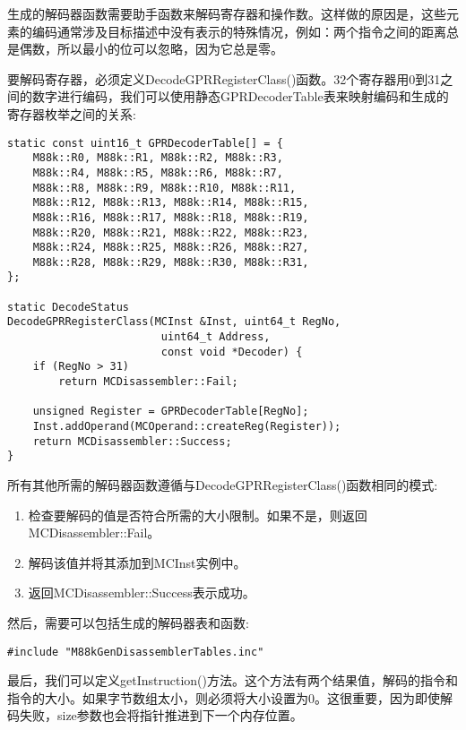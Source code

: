 生成的解码器函数需要助手函数来解码寄存器和操作数。这样做的原因是，这些元素的编码通常涉及目标描述中没有表示的特殊情况，例如：两个指令之间的距离总是偶数，所以最小的位可以忽略，因为它总是零。\par

要解码寄存器，必须定义DecodeGPRRegisterClass()函数。32个寄存器用0到31之间的数字进行编码，我们可以使用静态GPRDecoderTable表来映射编码和生成的寄存器枚举之间的关系:\par

\begin{lstlisting}[caption={}]
static const uint16_t GPRDecoderTable[] = {
	M88k::R0, M88k::R1, M88k::R2, M88k::R3,
	M88k::R4, M88k::R5, M88k::R6, M88k::R7,
	M88k::R8, M88k::R9, M88k::R10, M88k::R11,
	M88k::R12, M88k::R13, M88k::R14, M88k::R15,
	M88k::R16, M88k::R17, M88k::R18, M88k::R19,
	M88k::R20, M88k::R21, M88k::R22, M88k::R23,
	M88k::R24, M88k::R25, M88k::R26, M88k::R27,
	M88k::R28, M88k::R29, M88k::R30, M88k::R31,
};

static DecodeStatus
DecodeGPRRegisterClass(MCInst &Inst, uint64_t RegNo,
						uint64_t Address,
						const void *Decoder) {
	if (RegNo > 31)
		return MCDisassembler::Fail;
		
	unsigned Register = GPRDecoderTable[RegNo];
	Inst.addOperand(MCOperand::createReg(Register));
	return MCDisassembler::Success;
}
\end{lstlisting}

所有其他所需的解码器函数遵循与DecodeGPRRegisterClass()函数相同的模式:\par

\begin{enumerate}
\item 检查要解码的值是否符合所需的大小限制。如果不是，则返回MCDisassembler::Fail。

\item 解码该值并将其添加到MCInst实例中。

\item 返回MCDisassembler::Success表示成功。

\end{enumerate}

然后，需要可以包括生成的解码器表和函数:\par

\begin{lstlisting}[caption={}]
#include "M88kGenDisassemblerTables.inc"
\end{lstlisting}

最后，我们可以定义getInstruction()方法。这个方法有两个结果值，解码的指令和指令的大小。如果字节数组太小，则必须将大小设置为0。这很重要，因为即使解码失败，size参数也会将指针推进到下一个内存位置。\par

